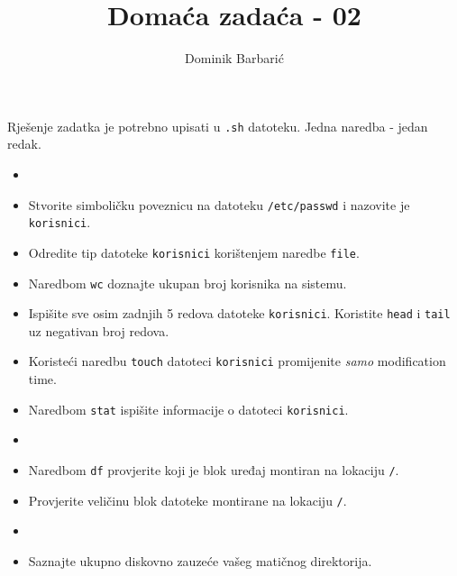 \documentclass[12pt,a4paper]{article}
\newcommand{\shell}[1]{\texttt{#1}}
\begin{document}
	\title{Domaća zadaća - 02}
	\author{Dominik Barbarić}
	\maketitle
	Rješenje zadatka je potrebno upisati u \shell{.sh} datoteku. Jedna naredba - jedan redak.
	\begin{itemize}
	\item[]
		\item Stvorite simboličku poveznicu na datoteku \shell{/etc/passwd} i nazovite je \shell{korisnici}.
		\item Odredite tip datoteke \shell{korisnici} korištenjem naredbe \shell{file}.
		\item Naredbom \shell{wc} doznajte ukupan broj korisnika na sistemu.
		\item Ispišite sve osim zadnjih 5 redova datoteke \shell{korisnici}. Koristite \shell{head} i \shell{tail} uz negativan broj redova.
		\item Koristeći naredbu \shell{touch} datoteci \shell{korisnici} promijenite \emph{samo} modification time.
		\item Naredbom \shell{stat} ispišite informacije o datoteci \shell{korisnici}.
		\item[]
		\item Naredbom \shell{df} provjerite koji je blok uređaj montiran na lokaciju \shell{/}.
		\item Provjerite veličinu blok datoteke montirane na lokaciju \shell{/}.
		\item[]
		\item Saznajte ukupno diskovno zauzeće vašeg matičnog direktorija.
	\end{itemize}
\end{document}

